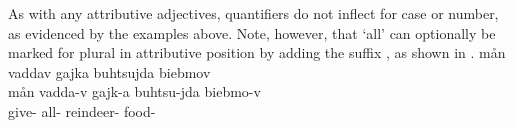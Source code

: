 As with any attributive adjectives, quantifiers do not inflect for case or number, as evidenced by the examples above. 
Note, however, that  ‘all’ can optionally be marked for plural in attributive position by adding the suffix , as shown in .
\ea\label{quantifierEx3}
\glll	mån vaddav gajka buhtsujda biebmov\\
	mån vadda-v gajk-a buhtsu-jda biebmo-v\\
	 give- all- reindeer- food-\\\nopagebreak
{}	
\z

